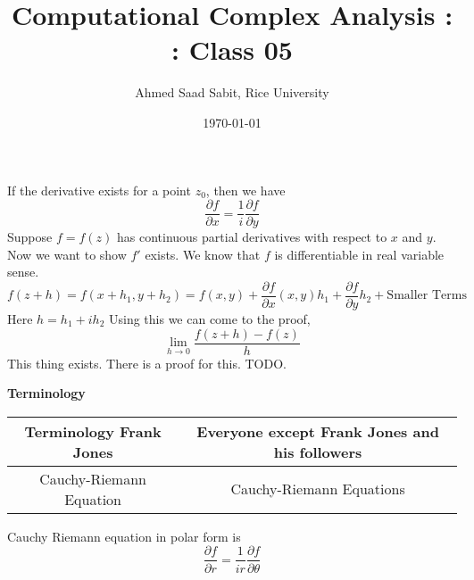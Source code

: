 \documentclass[letter]{article}
\title{Computational Complex Analysis : : Class 05}
\author{Ahmed Saad Sabit, Rice University}
\date{\today}
\begin{document}
\maketitle
	If the derivative exists for a point $z_0$, then we have \[
	\frac{\partial f}{\partial x} = \frac{1}{i} \frac{\partial f}{\partial y}
	\] 
	Suppose $f=f(z)$ has continuous partial derivatives with respect to $x$ and $y$. Now we want to show $f'$ exists. We know that $f$ is differentiable in real variable sense. 
	\[
	f(z+h) = f(x+h_1,y+h_2) = f(x,y) + \frac{\partial f}{\partial x} (x,y)h_1 + \frac{\partial f}{\partial y} h_2 + \text{Smaller Terms}
	\] 
	Here $h = h_1 + ih_2$ Using this we can come to the proof, 
	\[
		\lim_{h \to 0} \frac{f(z+h) - f(z)}{h} 	
	\] This thing exists. There is a proof for this. TODO. 

\textbf{Terminology} 
\begin{table}[htpb]
	\centering
	\label{tab:label}
	\begin{tabular}{c|c}
	\textbf{Terminology} 
	\textbf{Frank Jones} & \textbf{Everyone except Frank Jones and his followers} \\ \hline
	Cauchy-Riemann Equation & Cauchy-Riemann Equations
	\end{tabular}
\end{table}

Cauchy Riemann equation in polar form is 
\[
\frac{\partial f}{\partial r} = \frac{1}{i r} \frac{ \partial f}{\partial \theta}
\] 
\end{document}

